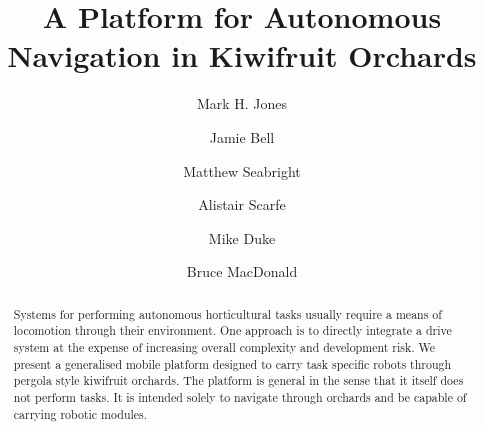 \documentclass[preprint,authoryear,12pt]{elsarticle}
\begin{document}
\begin{frontmatter}



\title{A Platform for Autonomous Navigation in Kiwifruit Orchards}



\author[UoW]{Mark H. Jones}

\author[UoA]{Jamie Bell}
\author[UoW]{Matthew Seabright}
\author[RPL]{Alistair Scarfe}
\author[UoW]{Mike Duke}
\author[UoA]{Bruce MacDonald}

\address[UoW]{School of Engineering, University of Waikato, Hamilton, New Zealand}
\address[UoA]{Faculty of Engineering, University of Auckland, Auckland, New Zealand}
\address[RPL]{Robotics Plus Ltd, Newnham Innovation Park, Tauranga, New Zealand}


\begin{abstract}
    Systems for performing autonomous horticultural tasks usually require a means of locomotion through their environment.
    One approach is to directly integrate a drive system at the expense of increasing overall complexity and development risk.
    We present a generalised mobile platform designed to carry task specific robots through pergola style kiwifruit orchards.
    The platform is general in the sense that it itself does not perform tasks.
    It is intended solely to navigate through orchards and be capable of carrying robotic modules.


\end{abstract}
\end{frontmatter}
\end{document}
